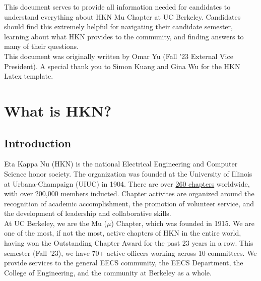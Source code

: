 \documentclass[11pt, article, oneside]{memoir}
\begin{document}
	\maketitle
	
	This document serves to provide all information needed for candidates to understand everything about HKN Mu Chapter at UC Berkeley.
    Candidates should find this extremely helpful for navigating their candidate semester, learning about what HKN provides to the community, and finding answers to many of their questions. \\

    This document was originally written by Omar Yu (Fall '23 External Vice President).
    A special thank you to Simon Kuang and Gina Wu for the HKN Latex template.
	
	\tableofcontents*
	\newpage

    
	\chapter{What is HKN?}
    \label{ch:what-is-hkn}

    \section{Introduction}
    \label{sec:introduction}
        Eta Kappa Nu (HKN) is the national Electrical Engineering and Computer Science honor society.
        The organization was founded at the University of Illinois at Urbana-Champaign (UIUC) in 1904.
        There are over \href{https://hkn.ieee.org/chapters/university-chapters}{260 chapters} worldwide, with over 200,000 members inducted.
        Chapter activites are organized around the recognition of academic accomplishment, the promotion of volunteer service, and the development of leadership and collaborative skills. \\

        At UC Berkeley, we are the Mu (\(\mu\)) Chapter, which was founded in 1915.
        We are one of the most, if not the most, active chapters of HKN in the entire world, having won the Outstanding Chapter Award for the past 23 years in a row.
        This semester (Fall '23), we have 70+ active officers working across 10 committees.
        We provide services to the general EECS community, the EECS Department, the College of Engineering, and the community at Berkeley as a whole.
        
\end{document}
